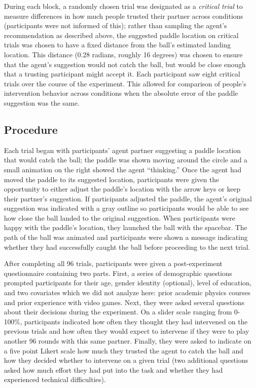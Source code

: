 \documentclass[10pt,letterpaper]{article}
\begin{document}
During each block, a randomly chosen trial was designated as a \textit{critical trial} to measure differences in how much people trusted their partner across conditions (participants were not informed of this); rather than sampling the agent's recommendation as described above, the suggested paddle location on critical trials was chosen to have a fixed distance from the ball's estimated landing location. This distance (0.28 radians, roughly 16 degrees) was chosen to ensure that the agent's suggestion would not catch the ball, but would be close enough that a trusting participant might accept it. Each participant saw eight critical trials over the course of the experiment. This allowed for comparison of people's intervention behavior across conditions when the absolute error of the paddle suggestion was the same. 


\subsection{Procedure}

Each trial began with participants' agent partner suggesting a paddle location that would catch the ball; the paddle was shown moving around the circle and a small animation on the right showed the agent ``thinking.'' Once the agent had moved the paddle to its suggested location, participants were given the opportunity to either adjust the paddle's location with the arrow keys or keep their partner's suggestion. If participants adjusted the paddle, the agent's original suggestion was indicated with a gray outline so participants would be able to see how close the ball landed to the original suggestion. When participants were happy with the paddle's location, they launched the ball with the spacebar. The path of the ball was animated and participants were shown a message indicating whether they had successfully caught the ball before proceeding to the next trial. 

After completing all 96 trials, participants were given a post-experiment questionnaire containing two parts. First, a series of demographic questions prompted participants for their age, gender identity (optional), level of education, and two covariates which we did not analyze here: prior academic physics courses and prior experience with video games. Next, they were asked several questions about their decisions during the experiment. On a slider scale ranging from 0-100\%, participants indicated how often they thought they had intervened on the previous trials and how often they would expect to intervene if they were to play another 96 rounds with this same partner. Finally, they were asked to indicate on a five point Likert scale how much they trusted the agent to catch the ball and how they decided whether to intervene on a given trial (two additional questions asked how much effort they had put into the task and whether they had experienced technical difficulties).
\end{document}
